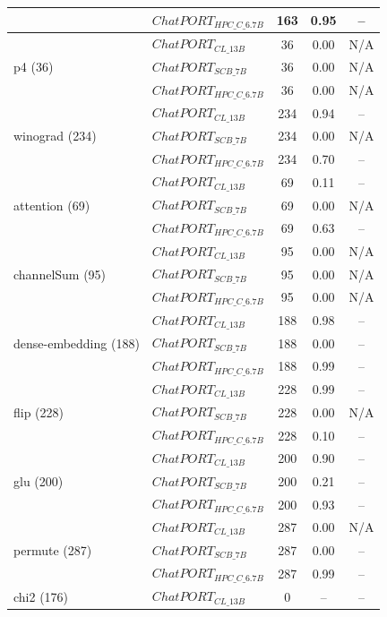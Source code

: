 \begin{table}[t]
\begin{tabular}{llccc}
&  $ChatPORT_{HPC\_C\_6.7B}$ & 163 & 0.95 & -- \\
\hline 
\multirow{3}{*}{p4 (36)} &  $ChatPORT_{CL\_13B}$ & 36 & 0.00 & N/A  \\
&  $ChatPORT_{SCB\_7B}$ & 36 & 0.00 & N/A \\
&  $ChatPORT_{HPC\_C\_6.7B}$ & 36 & 0.00 & N/A \\
\hline 
\multirow{3}{*}{winograd (234)} &  $ChatPORT_{CL\_13B}$ & 234 & 0.94 & --  \\
&  $ChatPORT_{SCB\_7B}$ & 234 & 0.00 & N/A \\
&  $ChatPORT_{HPC\_C\_6.7B}$ & 234 & 0.70 & -- \\
\hline 
\multirow{3}{*}{attention (69)} &  $ChatPORT_{CL\_13B}$ & 69 & 0.11 & --  \\
&  $ChatPORT_{SCB\_7B}$ & 69 & 0.00 & N/A \\
&  $ChatPORT_{HPC\_C\_6.7B}$ & 69 & 0.63 & -- \\
\hline 
\multirow{3}{*}{channelSum (95)} &  $ChatPORT_{CL\_13B}$ & 95 & 0.00 & N/A  \\
&  $ChatPORT_{SCB\_7B}$ & 95 & 0.00 & N/A \\
&  $ChatPORT_{HPC\_C\_6.7B}$ & 95 & 0.00 & N/A \\
\hline 
\multirow{3}{*}{dense-embedding (188)} &  $ChatPORT_{CL\_13B}$ & 188 & 0.98 & --  \\
&  $ChatPORT_{SCB\_7B}$ & 188 & 0.00 & -- \\
&  $ChatPORT_{HPC\_C\_6.7B}$ & 188 & 0.99 & -- \\
\hline 
\multirow{3}{*}{flip (228)} &  $ChatPORT_{CL\_13B}$ & 228 & 0.99 & --  \\
&  $ChatPORT_{SCB\_7B}$ & 228 & 0.00 & N/A \\
&  $ChatPORT_{HPC\_C\_6.7B}$ & 228 & 0.10 & -- \\
\hline 
\multirow{3}{*}{glu (200)} &  $ChatPORT_{CL\_13B}$ & 200 & 0.90 & --  \\
&  $ChatPORT_{SCB\_7B}$ & 200 & 0.21 & -- \\
&  $ChatPORT_{HPC\_C\_6.7B}$ & 200 & 0.93 & -- \\
\hline 
\multirow{3}{*}{permute (287)} &  $ChatPORT_{CL\_13B}$ & 287 & 0.00 & N/A  \\
&  $ChatPORT_{SCB\_7B}$ & 287 & 0.00 & -- \\
&  $ChatPORT_{HPC\_C\_6.7B}$ & 287 & 0.99 & -- \\
\hline 
\multirow{3}{*}{chi2 (176)} &  $ChatPORT_{CL\_13B}$ & 0 & -- & --  \\

\end{tabular}
\end{table}

